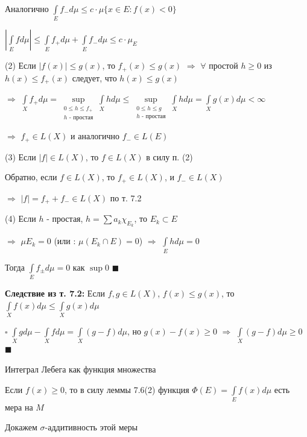 \documentclass[a4paper]{report}
\begin{document}
Аналогично $\displaystyle\int\limits_E f_-d\mu\le c\cdot\mu\{x\in E\colon f(x)<0\}$

$\left|\displaystyle\int\limits_E fd\mu\right|\le\displaystyle\int\limits_E f_+d\mu+\displaystyle\int\limits_E f_-d\mu\le c\cdot\mu_E$

(2) Если $|f(x)|\le g(x)$, то $f_+(x)\le g(x)$ $\Rightarrow$ $\forall$ простой $h\ge0$ из $h(x)\le f_+(x)$ следует, что $h(x)\le g(x)$ 

$\Rightarrow$ $\displaystyle\int\limits_X f_+d\mu=\sup\limits_{\substack{0\le h\le f_+\\ h\text{ - простая}}}\displaystyle\int\limits_X hd\mu\le\sup\limits_{\substack{0\le h\le g\\ h
\text{ - простая}}}\displaystyle\int\limits_X hd\mu=\displaystyle\int\limits_X g(x)d\mu<\infty$

$\Rightarrow$ $f_+\in L(X)$ и аналогично $f_-\in L(E)$

(3) Если $|f|\in L(X)$, то $f\in L(X)$ в силу п. (2)

Обратно, если $f\in L(X)$, то $f_+\in L(X)$, и $f_-\in L(X)$ 

$\Rightarrow$ $|f|=f_++f_-\in L(X)$ по т. 7.2

(4) Если $h$ - простая, $h=\sum a_k\chi_{E_k}$, то $E_k\subset E$ 

$\Rightarrow$ $\mu E_k=0$ (или : $\mu(E_k\cap E)=0$) $\Rightarrow$ $\displaystyle\int\limits_E hd\mu=0$

Тогда $\displaystyle\int\limits_E f_\pm d\mu=0$ как $\sup{0}$ $\blacksquare$
\bigskip

\noindent\textbf{Следствие из т. 7.2:} Если $f,g\in L(X)$, $f(x)\le g(x)$, то $\displaystyle\int\limits_X f(x)d\mu\le\displaystyle\int\limits_X g(x) d\mu$

\noindent $\square$ $\displaystyle\int\limits_X gd\mu-\displaystyle\int\limits_X fd\mu=\displaystyle\int\limits_X(g-f)d\mu$, но $g(x)-f(x)\ge0$ $\Rightarrow$ $\displaystyle\int\limits_X(g-f)d\mu\ge0$ $\blacksquare$
\bigskip
\bigskip
\bigskip

\begin{center}
\Large{Интеграл Лебега как функция множества}
\end{center}

\normalsize
\bigskip

Если $f(x)\ge0$, то в силу леммы 7.6(2) функция $\Phi(E)=\displaystyle\int\limits_E f(x)d\mu$ есть мера на $M$

Докажем $\sigma$-аддитивность этой меры
\bigskip
\end{document}
